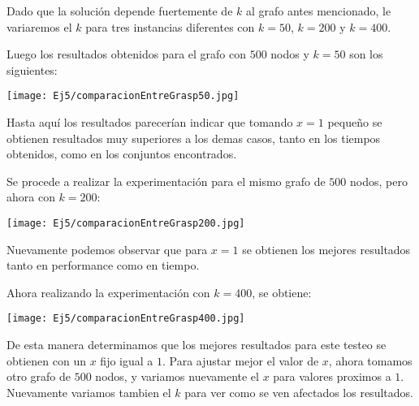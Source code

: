 Dado que la solución depende fuertemente de $k$ al grafo antes mencionado, le variaremos el $k$ para tres instancias diferentes con $k = 50$, $k = 200$ y $k = 400$.

Luego los resultados obtenidos para el grafo con $500$ nodos y $k = 50$ son los siguientes:

\texttt{[image: Ej5/comparacionEntreGrasp50.jpg]}

Hasta aquí los resultados parecerían indicar que tomando $x = 1$ pequeño se obtienen resultados muy superiores a los demas casos, tanto en los tiempos obtenidos, como en los conjuntos encontrados.

Se procede a realizar la experimentación para el mismo grafo de $500$ nodos, pero ahora con $k = 200$:

\texttt{[image: Ej5/comparacionEntreGrasp200.jpg]}

Nuevamente podemos observar que para $x = 1$ se obtienen los mejores resultados tanto en performance como en tiempo.

Ahora realizando la experimentación con $k = 400$, se obtiene:

\texttt{[image: Ej5/comparacionEntreGrasp400.jpg]}

De esta manera determinamos que los mejores resultados para este testeo se obtienen con un $x$ fijo igual a $1$. Para ajustar mejor el valor de $x$, ahora tomamos otro grafo de $500$ nodos, y variamos nuevamente el $x$ para valores proximos a $1$. Nuevamente variamos tambien el $k$ para ver como se ven afectados los resultados.



